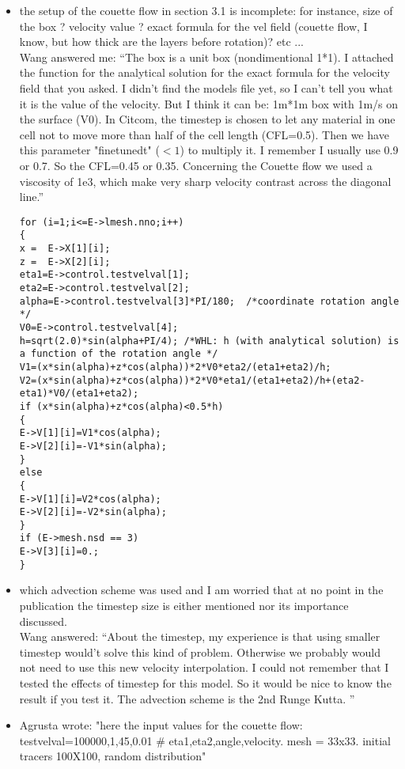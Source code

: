 \begin{itemize}
\item the setup of the couette flow in section 3.1 is 
incomplete: for instance, size of the box ? velocity value ? exact 
formula for the vel field (couette flow, I know, but how thick are the 
layers before rotation)? etc ...\\
Wang answered me: ``The box is a unit box (nondimentional 1*1). I attached the function for 
the analytical solution for the exact formula for the velocity field that you asked. I didn't 
find the models file yet, so I can't tell you what it is the value of the velocity. 
But I think it can be: 1m*1m box with 1m/s on the surface (V0).
In Citcom, the timestep is chosen to let any material in one cell not to move more than half
of the cell length (CFL=0.5). Then we have this parameter "finetunedt" ($<1$) to multiply it. I remember
I usually use 0.9 or 0.7.  So the CFL=0.45 or 0.35. 
Concerning the Couette flow we used a viscosity of 1e3, 
which make very sharp velocity contrast across the diagonal line.''
\begin{small}
\begin{verbatim}
for (i=1;i<=E->lmesh.nno;i++)
{     
x =  E->X[1][i]; 
z =  E->X[2][i];
eta1=E->control.testvelval[1];
eta2=E->control.testvelval[2];
alpha=E->control.testvelval[3]*PI/180;  /*coordinate rotation angle */
V0=E->control.testvelval[4];
h=sqrt(2.0)*sin(alpha+PI/4); /*WHL: h (with analytical solution) is a function of the rotation angle */
V1=(x*sin(alpha)+z*cos(alpha))*2*V0*eta2/(eta1+eta2)/h;
V2=(x*sin(alpha)+z*cos(alpha))*2*V0*eta1/(eta1+eta2)/h+(eta2-eta1)*V0/(eta1+eta2);
if (x*sin(alpha)+z*cos(alpha)<0.5*h)          
{
E->V[1][i]=V1*cos(alpha);
E->V[2][i]=-V1*sin(alpha);
}
else
{
E->V[1][i]=V2*cos(alpha);
E->V[2][i]=-V2*sin(alpha);
}
if (E->mesh.nsd == 3)
E->V[3][i]=0.;
}
\end{verbatim}
\end{small}

\item which advection scheme was used and 
I am worried that at no point in the publication the timestep size is 
either mentioned nor its importance discussed.\\
Wang answered: ``About the timestep, my experience is that using smaller timestep 
would't solve this kind of problem. Otherwise we probably
would not need to use this new velocity interpolation.  I could not remember that I tested 
the effects of timestep for this model. So it would be nice to know the result if you test it.  
The advection scheme is the 2nd Runge Kutta. ''

\item Agrusta wrote: "here the input values for the couette flow: 
testvelval=100000,1,45,0.01    \# eta1,eta2,angle,velocity. mesh = 33x33. 
initial tracers 100X100, random distribution"

\end{itemize}

